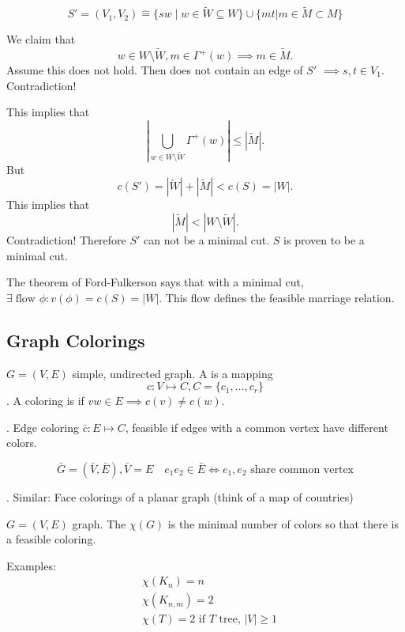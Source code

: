 \[
S' = (V_1,V_2) \hat{=}
    \{sw\mid w \in \widetilde{W} \subseteq W \} \cup
    \{mt | m \in \widetilde{M} \subset M \}
\]

\def\GammaPlus{\Gamma^{+}}

We claim that
\[
    w\in W\setminus\widetilde{W}, m\in\GammaPlus(w)
    \implies m\in\widetilde{M}.
\]
Assume this does not hold. Then
 does not contain an edge of $S'$ $\implies s, t\in V_1$. Contradiction!

This implies that
\[
    |\bigcup\limits_{w\in W\setminus\widetilde{W}} \GammaPlus(w)|
    ≤ |\widetilde{M}|.
\]
But
\[
    c(S') = |\widetilde{W}| + |\widetilde{M}| < c(S) = |W|.
\]
This implies that
\[
    |\widetilde{M}| < |W\setminus \widetilde{W}|.
\]
Contradiction! Therefore $S'$ can not be a minimal cut. $S$ is proven to be a minimal cut.

The theorem of Ford-Fulkerson says that with a minimal cut,
$\exists\;\text{flow }\phi: v(\phi) = c(S) = |W|$. This flow defines the feasible marriage relation.


\subsection{Graph Colorings}

\begin{definition}
$G=(V,E)$ simple, undirected graph.
A  is a mapping
\[
    c : V\mapsto C, C=\{c_1,\ldots,c_r\}
\].
A coloring is  if $vw\in E\implies c(v)≠c(w)$.
\end{definition}

\Remark. Edge coloring $\bar{c}: E\mapsto C$, feasible if edges with a common vertex have different colors.

\[
  \bar{G} = (\bar V, \bar E), \bar V = E \quad
  e_1 e_2\in \bar E \iff e_1,e_2\text{ share common vertex}
\]

\Remark. Similar: Face colorings of a planar graph (think of a map of countries)

\begin{definition}
$G=(V,E)$ graph. The  $\chi(G)$ is the minimal number of colors so that there is a feasible coloring.
\end{definition}

Examples:
\begin{align*}
  &\chi(K_n) = n \\
  &\chi(K_{n,m}) = 2 \\
  &\chi(T) = 2 \text{ if $T$ tree, } |V| ≥ 1
\end{align*}

